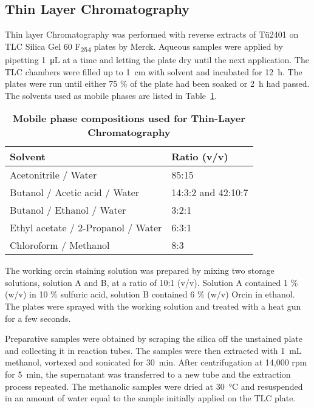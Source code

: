 	\subsection{Thin Layer Chromatography} %
	\label{sub:thin_layer_chromatography}
	Thin layer Chromatography was performed with reverse extracts of T\"u2401 on TLC Silica Gel 60 F\textsubscript{254} plates by Merck.
	Aqueous samples were applied by pipetting \SI{1}{\micro\liter} at a time and letting the plate dry until the next application. The TLC chambers were filled up to \SI{1}{\centi\meter} with solvent and incubated for \SI{12}{\hour}. The plates were run until either 75 \% of the plate had been soaked or \SI{2}{\hour} had passed. The solvents used as mobile phases are listed in Table~\ref{tab:tlc_solvents}.

	\begin{table}[htbp]
		\caption[Mobile phase compositions used for Thin-Layer Chromatography]{\textbf{Mobile phase compositions used for Thin-Layer Chromatography}}
		\label{tab:tlc_solvents}
		\centering
		\begin{tabularx}{\textwidth}{XX}
			\toprule
			\textbf{Solvent}			& \textbf{Ratio (v/v)}	\\
			\midrule
			Acetonitrile / Water				& 85:15		\\
			Butanol / Acetic acid / Water		& 14:3:2 and 42:10:7	\\
			Butanol / Ethanol / Water			& 3:2:1		\\
			Ethyl acetate / 2-Propanol / Water	& 6:3:1		\\
			Chloroform / Methanol				& 8:3		\\
			\bottomrule
		\end{tabularx}
	\end{table}

	The working orcin staining solution was prepared by mixing two storage solutions, solution A and B, at a ratio of 10:1 (v/v). Solution A contained 1 \% (w/v)  in 10 \% sulfuric acid, solution B contained 6 \% (w/v) Orcin in ethanol. The plates were sprayed with the working solution and treated with a heat gun for a few seconds.

	Preparative samples were obtained by scraping the silica off the unstained plate and collecting it in reaction tubes. The samples were then extracted with \SI{1}{\milli\liter} methanol, vortexed and sonicated for \SI{30}{\minute}. After centrifugation at 14,000 rpm for \SI{5}{\minute}, the supernatant was transferred to a new tube and the extraction process repeated. The methanolic samples were dried at \SI{30}{\celsius} and resuspended in an amount of water equal to the sample initially applied on the TLC plate.

